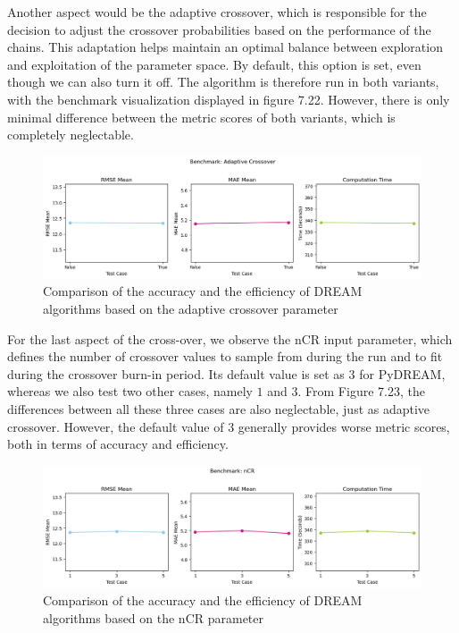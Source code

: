 Another aspect would be the adaptive crossover, which is responsible for the decision to adjust the crossover probabilities based on the performance of the chains.\cite{dream} This adaptation helps maintain an optimal balance between exploration and exploitation of the parameter space. By default, this option is set, even though we can also turn it off. The algorithm is therefore run in both variants, with the benchmark visualization displayed in figure 7.22. However, there is only minimal difference between the metric scores of both variants, which is completely neglectable. 
\begin{figure}[H]
    \centering
    \includegraphics[width=1\textwidth]{figures/dream/adaptive_crossover.png}
    \captionsetup{width=.8\textwidth}
    \caption{Comparison of the accuracy and the efficiency of DREAM algorithms based on the adaptive crossover parameter}
    \label{fig:enter-label}
\end{figure}

For the last aspect of the cross-over, we observe the nCR input parameter, which defines the number of crossover values to sample from during the run and to fit during the crossover burn-in period. Its default value is set as $3$ for PyDREAM, whereas we also test two other cases, namely $1$ and $3$. From Figure 7.23, the differences between all these three cases are also neglectable, just as adaptive crossover. However, the default value of $3$ generally provides worse metric scores, both in terms of accuracy and efficiency.
\begin{figure}[H]
    \centering
    \includegraphics[width=1\textwidth]{figures/dream/nCR.png}
    \captionsetup{width=.8\textwidth}
    \caption{Comparison of the accuracy and the efficiency of DREAM algorithms based on the nCR parameter}
    \label{fig:enter-label}
\end{figure}

